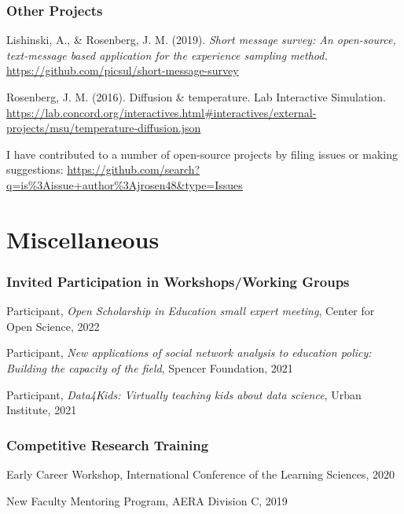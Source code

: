 \documentclass[
  14,
]{article}
\begin{document}
\hypertarget{other-projects}{%
\subsubsection{Other Projects}\label{other-projects}}

Lishinski, A., \& Rosenberg, J. M. (2019). \emph{Short message survey:
An open-source, text-message based application for the experience
sampling method.} \url{https://github.com/picsul/short-message-survey}

Rosenberg, J. M. (2016). Diffusion \& temperature. Lab Interactive
Simulation.
\url{https://lab.concord.org/interactives.html\#interactives/external-projects/msu/temperature-diffusion.json}

I have contributed to a number of open-source projects by filing issues
or making suggestions:
\url{https://github.com/search?q=is\%3Aissue+author\%3Ajrosen48\&type=Issues}

\hypertarget{miscellaneous}{%
\section{Miscellaneous}\label{miscellaneous}}

\hypertarget{invited-participation-in-workshopsworking-groups}{%
\subsubsection{Invited Participation in Workshops/Working
Groups}\label{invited-participation-in-workshopsworking-groups}}

Participant, \emph{Open Scholarship in Education small expert meeting},
Center for Open Science, 2022

Participant, \emph{New applications of social network analysis to
education policy: Building the capacity of the field}, Spencer
Foundation, 2021

Participant, \emph{Data4Kids: Virtually teaching kids about data
science}, Urban Institute, 2021

\hypertarget{competitive-research-training}{%
\subsubsection{Competitive Research
Training}\label{competitive-research-training}}

Early Career Workshop, International Conference of the Learning
Sciences, 2020

New Faculty Mentoring Program, AERA Division C, 2019
\end{document}
